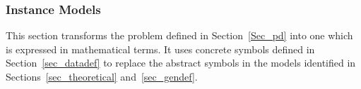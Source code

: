 \documentclass[12pt]{article}
\newcommand{\colAwidth}{0.13\textwidth}
\newcommand{\colBwidth}{0.82\textwidth}
\begin{document}



\subsubsection{Instance Models} \label{sec_instance}    


This section transforms the problem defined in Section~\ref{Sec_pd} into 
one which is expressed in mathematical terms. It uses concrete symbols defined 
in Section~\ref{sec_datadef} to replace the abstract symbols in the models 
identified in Sections~\ref{sec_theoretical} and~\ref{sec_gendef}.




~\newline
\end{document}
